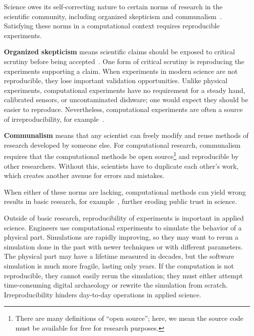 

Science owes its self-correcting nature to certain norms of research in the scientific community, including organized skepticism and communalism~\cite{merton_sociology_1974}.
Satisfying these norms in a computational context requires reproducible experiments.


\textbf{Organized skepticism} means scientific claims should be exposed to critical scrutiny before being accepted~\cite{merton_sociology_1974}.
One form of critical scrutiny is reproducing the experiments supporting a claim.
When experiments in modern science are not reproducible, they lose important validation opportunities.
Unlike physical experiments, computational experiments have no requirement for a steady hand, calibrated sensors, or uncontaminated dishware; one would expect they should be easier to reproduce.
Nevertheless, computational experiments are often a source of irreproducibility, for example~\cite{mytkowicz_producing_2009,neupane_characterization_2019}.

\textbf{Communalism} means that any scientist can freely modify and reuse methods of research developed by someone else.
For computational research, communalism requires that the computational methods be open source\footnote{There are many definitions of ``open source''; here, we mean the source code must be available for free for research purposes.} and reproducible by other researchers.
Without this, scientists have to duplicate each other's work, which creates another avenue for errors and mistakes.

When either of these norms are lacking, computational methods can yield wrong results in basic research, for example~\cite{herndon_does_2014,miller_scientists_2006,wang_retracted_2012,neupane_characterization_2019,qiu_retraction_2019,villanueva_no_2021,mytkowicz_producing_2009}, further eroding public trust in science.

Outside of basic research, reproducibility of experiments is important in applied science.
Engineers use computational experiments to simulate the behavior of a physical part.
Simulations are rapidly improving, so they may want to rerun a simulation done in the past with newer techniques or with different parameters.
The physical part may have a lifetime measured in decades, but the software simulation is much more fragile, lasting only years.
If the computation is not reproducible, they cannot easily rerun the simulation; they must either attempt time-consuming digital archaeology or rewrite the simulation from scratch.
Irreproducibility hinders day-to-day operations in applied science.
